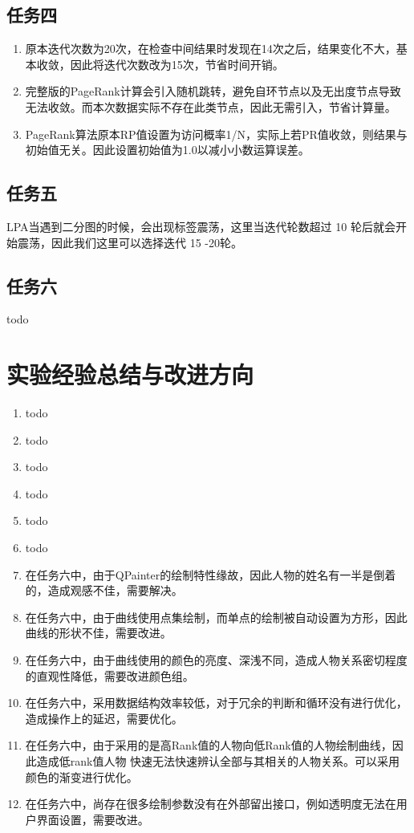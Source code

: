\documentclass[a4paper,UTF8]{article}
\numberwithin{equation}{section}
\begin{document}
\subsection{任务四}
\begin{enumerate}[1)]
    \item 原本迭代次数为20次，在检查中间结果时发现在14次之后，结果变化不大，基本收敛，因此将迭代次数改为15次，节省时间开销。
    \item 完整版的PageRank计算会引入随机跳转，避免自环节点以及无出度节点导致无法收敛。而本次数据实际不存在此类节点，因此无需引入，节省计算量。
    \item PageRank算法原本RP值设置为访问概率1/N，实际上若PR值收敛，则结果与初始值无关。因此设置初始值为1.0以减小小数运算误差。
\end{enumerate}
\subsection{任务五}
LPA当遇到二分图的时候，会出现标签震荡，这里当迭代轮数超过 10 轮后就会开始震荡，因此我们这里可以选择迭代 15 -20轮。

\subsection{任务六}
todo
\section{实验经验总结与改进方向}
\begin{enumerate}[1)]
    \item todo
    \item todo
    \item todo
    \item todo
    \item todo
    \item todo
    \item 在任务六中，由于QPainter的绘制特性缘故，因此人物的姓名有一半是倒着的，造成观感不佳，需要解决。
    \item 在任务六中，由于曲线使用点集绘制，而单点的绘制被自动设置为方形，因此曲线的形状不佳，需要改进。
    \item 在任务六中，由于曲线使用的颜色的亮度、深浅不同，造成人物关系密切程度的直观性降低，需要改进颜色组。
    \item 在任务六中，采用数据结构效率较低，对于冗余的判断和循环没有进行优化，造成操作上的延迟，需要优化。
    \item 在任务六中，由于采用的是高Rank值的人物向低Rank值的人物绘制曲线，因此造成低rank值人物
    快速无法快速辨认全部与其相关的人物关系。可以采用颜色的渐变进行优化。
    \item 在任务六中，尚存在很多绘制参数没有在外部留出接口，例如透明度无法在用户界面设置，需要改进。
\end{enumerate}


\end{document}
